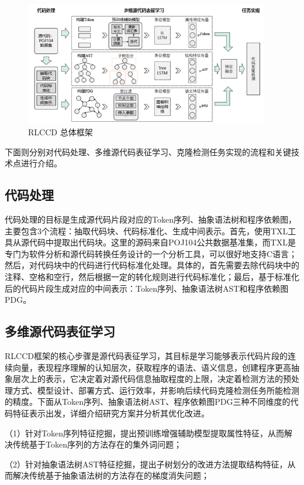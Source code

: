 \begin{figure}[H]
    \centering
    \includegraphics[width=0.95\textwidth]{figures/framework}
    \caption{RLCCD 总体框架}
    \label{fig:framework}
\end{figure}

下面则分别对代码处理、多维源代码表征学习、克隆检测任务实现的流程和关键技术点进行介绍。

\subsection{代码处理}
代码处理的目标是生成源代码片段对应的Token序列、抽象语法树和程序依赖图，主要包含3个流程：抽取代码块、代码标准化、生成中间表示。首先，使用TXL工具从源代码中提取出代码块。这里的源码来自POJ104公共数据基准集，而TXL是专门为软件分析和源代码转换任务设计的一个分析工具，可以很好地支持C语言；然后，对代码块中的代码进行代码标准化处理。具体的，首先需要去除代码块中的注释、空格和空行，然后根据一定的转化规则进行代码标准化；最后，基于标准化后的代码片段生成对应的中间表示：Token序列、抽象语法树AST和程序依赖图PDG。

\subsection{多维源代码表征学习}
RLCCD框架的核心步骤是源代码表征学习，其目标是学习能够表示代码片段的连续向量，表现程序理解的认知层次，获取程序的语法、语义信息，创建程序更高抽象层次上的表示，它决定着对源代码信息抽取程度的上限，决定着检测方法的预处理方式、模型设计、部署方式、运行效率，并影响后续代码克隆检测任务所能检测的精度。下面从Token序列、抽象语法树AST、程序依赖图PDG三种不同维度的代码特征表示出发，详细介绍研究方案并分析其优化改进。

（1）针对Token序列特征挖掘，提出预训练增强辅助模型提取属性特征，从而解决传统基于Token序列的方法存在的集外词问题；

（2）针对抽象语法树AST特征挖掘，提出子树划分的改进方法提取结构特征，从而解决传统基于抽象语法树的方法存在的梯度消失问题；

